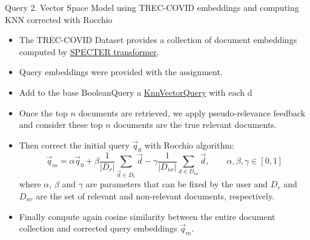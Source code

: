 \documentclass[10pt]{beamer}
\begin{document}
{\begin{frame}{Query 2. Vector Space Model using TREC-COVID embeddings and computing KNN corrected with Rocchio \cite{salton1990improving}}
    \begin{itemize}
        \item The TREC-COVID Dataset provides a collection of document embeddings computed by \href{https://arxiv.org/abs/2004.07180}{SPECTER transformer}.
        \item Query embeddings were provided with the assignment.
        \item Add to the base BooleanQuery a \href{https://lucene.apache.org/core/9_0_0/core/org/apache/lucene/search/KnnVectorQuery.html}{KnnVectorQuery} with each d
        \item Once the top $n$ documents are retrieved, we apply pseudo-relevance feedback and consider these top $n$ documents are the true relevant documents.
        \item Then correct the initial query $\vec{q}_0$ with Rocchio algorithm:
        \[ \vec{q}_m = \alpha \vec{q}_0 + \beta \frac{1}{|D_r|} \sum_{\vec{d}\in D_r}\vec{d} - \gamma \frac{1}{|D_{nr}|} \sum_{d\in D_{nr}} \vec{d}, \qquad \alpha, \beta, \gamma \in [0,1]\]
        where $\alpha$, $\beta$ and $\gamma$ are parameters that can be fixed by the user and $D_r$ and $D_{nr}$ are the set of relevant and non-relevant documents, respectively.
        \item Finally compute again cosine similarity between the entire document collection and corrected query embeddings $\vec{q}_m$.
    \end{itemize}
\end{frame}

}
\end{document}
